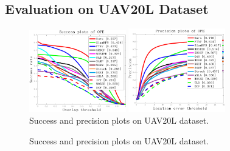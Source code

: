 \subsection{Evaluation on UAV20L Dataset}

\begin{figure}[htb]
\begin{minipage}[b]{.48\linewidth}
  \centering
  \centerline{\includegraphics[width=4.2cm]{Img/globally/UAV20L/quality_plot_overlap_OPE_AUC.png}}
\end{minipage}
\hfill
\begin{minipage}[b]{0.48\linewidth}
  \centering
  \centerline{\includegraphics[width=4.2cm]{Img/globally/UAV20L/quality_plot_error_OPE_threshold.png}}
\end{minipage}
%
\vspace{-0.5cm}
\caption{Success and precision plots on UAV20L dataset.}
\label{fig:uav20l}
%
\end{figure}

\iffalse
\begin{figure}[t]
\begin{center}
\end{center}
   \caption{Success and precision plots on UAV20L dataset.}
\label{fig:uav20l}
\end{figure}

